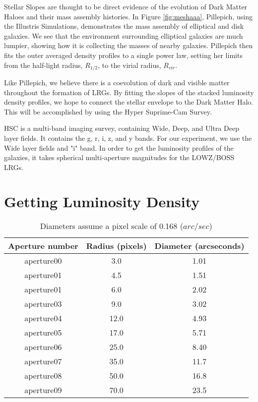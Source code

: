 \documentclass{article}
\begin{document}
Stellar Slopes are thought to be direct evidence of the evolution of Dark Matter Haloes and their mass assembly histories. In Figure \ref{fig:meshaaa}, Pillepich, using the Illustris Simulations, demonstrates the mass assembly of elliptical and disk galaxies. We see that the environment surrounding elliptical galaxies are much lumpier, showing how it is collecting the masses of nearby galaxies. Pillepich then fits the outer averaged density profiles to a single power law, setting her limits from the half-light radius, $R_{1/2}$, to the virial radius, $R_{vir}$.

Like Pillepich, we believe there is a coevolution of dark and visible matter throughout the formation of LRGs. By fitting the slopes of the stacked luminosity density profiles, we hope to connect the stellar envelope to the Dark Matter Halo. This will be accomplished by using the Hyper Suprime-Cam Survey.

HSC is a multi-band imaging survey, containing Wide, Deep, and Ultra Deep layer fields. It contains the g, r, i, z, and y bands. For our experiment, we use the Wide layer fields and "i" band. In order to get the luminosity profiles of the galaxies, it takes spherical multi-aperture magnitudes for the LOWZ/BOSS LRGs. 

\section{Getting Luminosity Density}

\begin{table}[!htb]
\centering
\begin{tabular}{ccc} \toprule
\textbf{Aperture number} & \textbf{Radius (pixels)} & \textbf{Diameter (arcseconds)} \\ \midrule
aperture00& 3.0 & 1.01\\
aperture01 & 4.5 &1.51  \\
aperture01 &6.0 &2.02\\
aperture03 &9.0 &3.02\\
aperture04 &12.0 &4.93 \\
aperture05 &17.0 &5.71 \\
aperture06 &25.0 &8.40 \\
aperture07 &35.0 &11.7\\
aperture08 &50.0 &16.8\\
aperture09 &70.0 &23.5\\ \bottomrule
\end{tabular}
\caption{Diameters assume a pixel scale of 0.168 ($arc/sec$)}
\label{table:1}
\hfill
\end{table}
\end{document}
